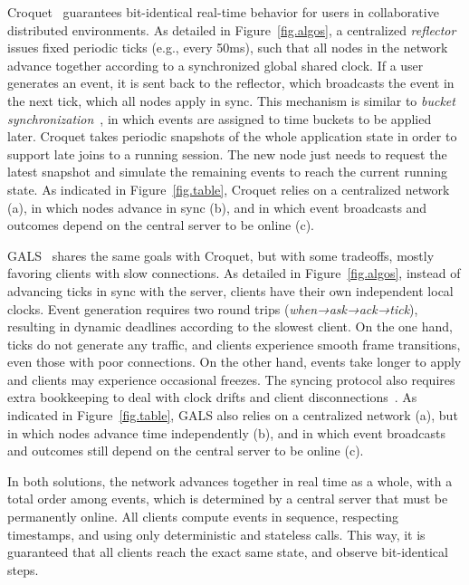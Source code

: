 \documentclass[10pt,journal,compsoc]{IEEEtran}
\begin{document}
Croquet~\cite{croquet,croquet2,croquet.site} guarantees bit-identical real-time
behavior for users in collaborative distributed environments.
%
As detailed in Figure~\ref{fig.algos}, a centralized \emph{reflector} issues
fixed periodic ticks (e.g., every 50ms), such that all nodes in the network
advance together according to a synchronized global shared clock.
If a user generates an event, it is sent back to the reflector, which
broadcasts the event in the next tick, which all nodes apply in sync.
%
This mechanism is similar to \emph{bucket synchronization}~\cite{gautier}, in
which events are assigned to time buckets to be applied later.
%
Croquet takes periodic snapshots of the whole application state in order to
support late joins to a running session.
The new node just needs to request the latest snapshot and simulate the
remaining events to reach the current running state.
%
As indicated in Figure~\ref{fig.table}, Croquet relies on a centralized
network (a), in which nodes advance in sync (b), and in which event broadcasts
and outcomes depend on the central server to be online (c).

GALS~\cite{gals} shares the same goals with Croquet, but with some tradeoffs,
mostly favoring clients with slow connections.
As detailed in Figure~\ref{fig.algos}, instead of advancing ticks in sync with
the server, clients have their own independent local clocks.
Event generation requires two round trips (\emph{when→ask→ack→tick}), resulting
in dynamic deadlines according to the slowest client.
%
On the one hand, ticks do not generate any traffic, and clients experience
smooth frame transitions, even those with poor connections.
On the other hand, events take longer to apply and clients may experience
occasional freezes.
The syncing protocol also requires extra bookkeeping to deal with clock drifts
and client disconnections~\cite{gals}.
%
As indicated in Figure~\ref{fig.table}, GALS also relies on a centralized
network (a), but in which nodes advance time independently (b), and in which
event broadcasts and outcomes still depend on the central server to be online
(c).

In both solutions, the network advances together in real time as a whole, with
a total order among events, which is determined by a central server that must
be permanently online.
All clients compute events in sequence, respecting timestamps, and using only
deterministic and stateless calls.
This way, it is guaranteed that all clients reach the exact same state, and
observe bit-identical steps.
\end{document}
